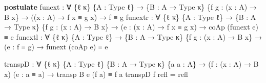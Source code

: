\documentclass[
  11pt,
  oneside,
  article]{memoir}
\newenvironment{Shaded}{}{}
\newcommand{\KeywordTok}[1]{\textcolor[rgb]{0.00,0.44,0.13}{\textbf{#1}}}
\newcommand{\NormalTok}[1]{#1}
\newcommand{\OtherTok}[1]{\textcolor[rgb]{0.00,0.44,0.13}{#1}}
\theoremstyle{definition}
\theoremstyle{plain}
\newcommand{\0}{\textsf{0}}
\newcommand{\1}{\tn{\textsf{1}}}
\begin{document}
\begin{Shaded}
\begin{Highlighting}[]
\KeywordTok{postulate}
\NormalTok{    funext }\OtherTok{:} \OtherTok{∀} \OtherTok{\{}\NormalTok{ℓ κ}\OtherTok{\}} \OtherTok{\{}\NormalTok{A }\OtherTok{:}\NormalTok{ Type ℓ}\OtherTok{\}} 
             \OtherTok{→} \OtherTok{\{}\NormalTok{B }\OtherTok{:}\NormalTok{ A }\OtherTok{→}\NormalTok{ Type κ}\OtherTok{\}} \OtherTok{\{}\NormalTok{f g }\OtherTok{:} \OtherTok{(}\NormalTok{x }\OtherTok{:}\NormalTok{ A}\OtherTok{)} \OtherTok{→}\NormalTok{ B x}\OtherTok{\}}
             \OtherTok{→} \OtherTok{((}\NormalTok{x }\OtherTok{:}\NormalTok{ A}\OtherTok{)} \OtherTok{→}\NormalTok{ f x ≡ g x}\OtherTok{)} \OtherTok{→}\NormalTok{ f ≡ g}
\NormalTok{    funextr }\OtherTok{:} \OtherTok{∀} \OtherTok{\{}\NormalTok{ℓ κ}\OtherTok{\}} \OtherTok{\{}\NormalTok{A }\OtherTok{:}\NormalTok{ Type ℓ}\OtherTok{\}} 
              \OtherTok{→} \OtherTok{\{}\NormalTok{B }\OtherTok{:}\NormalTok{ A }\OtherTok{→}\NormalTok{ Type κ}\OtherTok{\}} \OtherTok{\{}\NormalTok{f g }\OtherTok{:} \OtherTok{(}\NormalTok{x }\OtherTok{:}\NormalTok{ A}\OtherTok{)} \OtherTok{→}\NormalTok{ B x}\OtherTok{\}}
              \OtherTok{→} \OtherTok{(}\NormalTok{e }\OtherTok{:} \OtherTok{(}\NormalTok{x }\OtherTok{:}\NormalTok{ A}\OtherTok{)} \OtherTok{→}\NormalTok{ f x ≡ g x}\OtherTok{)} \OtherTok{→}\NormalTok{ coAp }\OtherTok{(}\NormalTok{funext e}\OtherTok{)}\NormalTok{ ≡ e}
\NormalTok{    funextl }\OtherTok{:} \OtherTok{∀} \OtherTok{\{}\NormalTok{ℓ κ}\OtherTok{\}} \OtherTok{\{}\NormalTok{A }\OtherTok{:}\NormalTok{ Type ℓ}\OtherTok{\}} 
              \OtherTok{→} \OtherTok{\{}\NormalTok{B }\OtherTok{:}\NormalTok{ A }\OtherTok{→}\NormalTok{ Type κ}\OtherTok{\}} \OtherTok{\{}\NormalTok{f g }\OtherTok{:} \OtherTok{(}\NormalTok{x }\OtherTok{:}\NormalTok{ A}\OtherTok{)} \OtherTok{→}\NormalTok{ B x}\OtherTok{\}}
              \OtherTok{→} \OtherTok{(}\NormalTok{e }\OtherTok{:}\NormalTok{ f ≡ g}\OtherTok{)} \OtherTok{→}\NormalTok{ funext }\OtherTok{(}\NormalTok{coAp e}\OtherTok{)}\NormalTok{ ≡ e}

\NormalTok{transpD }\OtherTok{:} \OtherTok{∀} \OtherTok{\{}\NormalTok{ℓ κ}\OtherTok{\}} \OtherTok{\{}\NormalTok{A }\OtherTok{:}\NormalTok{ Type ℓ}\OtherTok{\}} \OtherTok{\{}\NormalTok{B }\OtherTok{:}\NormalTok{ A }\OtherTok{→}\NormalTok{ Type κ}\OtherTok{\}} \OtherTok{\{}\NormalTok{a a\textquotesingle{} }\OtherTok{:}\NormalTok{ A}\OtherTok{\}}
          \OtherTok{→} \OtherTok{(}\NormalTok{f }\OtherTok{:} \OtherTok{(}\NormalTok{x }\OtherTok{:}\NormalTok{ A}\OtherTok{)} \OtherTok{→}\NormalTok{ B x}\OtherTok{)} \OtherTok{(}\NormalTok{e }\OtherTok{:}\NormalTok{ a ≡ a\textquotesingle{}}\OtherTok{)}
          \OtherTok{→}\NormalTok{ transp B e }\OtherTok{(}\NormalTok{f a}\OtherTok{)}\NormalTok{ ≡ f a\textquotesingle{}}
\NormalTok{transpD f refl }\OtherTok{=}\NormalTok{ refl}


\end{Highlighting}
\end{Shaded}
\end{document}
